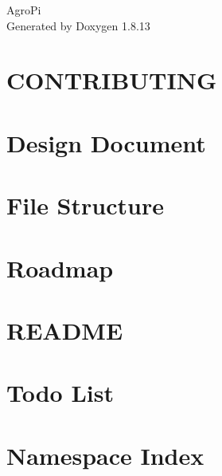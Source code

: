 \documentclass[twoside]{book}
\newcommand{\+}{\discretionary{\mbox{\scriptsize$\hookleftarrow$}}{}{}}
\newcommand{\clearemptydoublepage}{%
  \newpage{\pagestyle{empty}\cleardoublepage}%
}
\begin{document}
\hypersetup{pageanchor=false,
             bookmarksnumbered=true,
             pdfencoding=unicode
            }
\begin{titlepage}
\vspace*{7cm}
\begin{center}%
{\Large Agro\+Pi }\\
\vspace*{1cm}
{\large Generated by Doxygen 1.8.13}\\
\end{center}
\end{titlepage}
\clearemptydoublepage
{}
\tableofcontents
\clearemptydoublepage
{}
\hypersetup{pageanchor=true}

\chapter{C\+O\+N\+T\+R\+I\+B\+U\+T\+I\+NG}
\label{md_docs_CONTRIBUTING}

\chapter{Design Document}
\label{autotoc_md1}

\chapter{File Structure}
\label{autotoc_md17}

\chapter{Roadmap}
\label{autotoc_md18}

\chapter{R\+E\+A\+D\+ME}
\label{md_src_website_node_modules_dygraphs_README}

\chapter{Todo List}
\label{todo}

\chapter{Namespace Index}

\end{document}
